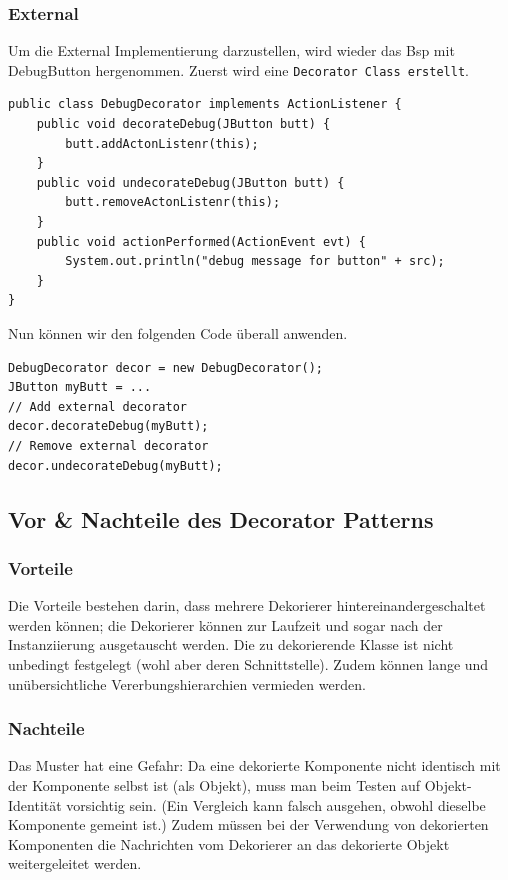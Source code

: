 	\subsubsection{External \cite{decoratorDebug}}
	Um die External Implementierung darzustellen, wird wieder das Bsp mit DebugButton hergenommen.
	Zuerst wird eine \texttt{Decorator Class erstellt}.
	
	\begin{lstlisting}[style=JavaG, caption=Decorator External \cite{decoratorDebug}]
public class DebugDecorator implements ActionListener {
	public void decorateDebug(JButton butt) {
		butt.addActonListenr(this);
	}
	public void undecorateDebug(JButton butt) {
		butt.removeActonListenr(this);
	}
	public void actionPerformed(ActionEvent evt) {
		System.out.println("debug message for button" + src);
	}
}
	\end{lstlisting}
	
	Nun können wir den folgenden Code überall anwenden.
	\begin{lstlisting}[style=JavaG, caption=Decorator External Aufruf\cite{decoratorDebug}]
DebugDecorator decor = new DebugDecorator();
JButton myButt = ...
// Add external decorator 
decor.decorateDebug(myButt);
// Remove external decorator
decor.undecorateDebug(myButt);
	\end{lstlisting}
	

\clearpage


	\subsection{Vor \& Nachteile des Decorator Patterns}
		\subsubsection{Vorteile}
		Die Vorteile bestehen darin, dass mehrere Dekorierer hintereinandergeschaltet werden können; die Dekorierer können zur Laufzeit und sogar nach der Instanziierung ausgetauscht werden. Die zu dekorierende Klasse ist nicht unbedingt festgelegt (wohl aber deren Schnittstelle). Zudem können lange und unübersichtliche Vererbungshierarchien vermieden werden.
		
		\subsubsection{Nachteile}
		Das Muster hat eine Gefahr: Da eine dekorierte Komponente nicht identisch mit der Komponente selbst ist (als Objekt), muss man beim Testen auf Objekt-Identität vorsichtig sein. (Ein Vergleich kann falsch ausgehen, obwohl dieselbe Komponente gemeint ist.) Zudem müssen bei der Verwendung von dekorierten Komponenten die Nachrichten vom Dekorierer an das dekorierte Objekt weitergeleitet werden.
	

